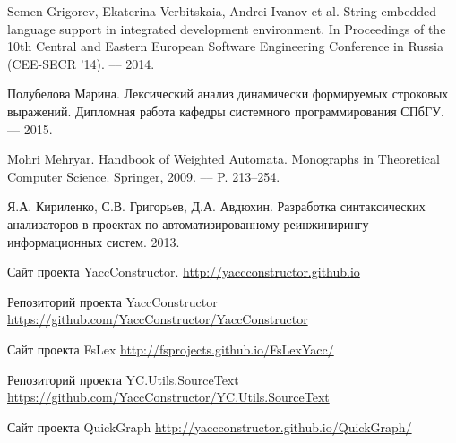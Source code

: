 \begin{thebibliography}{99}

  Semen Grigorev, Ekaterina Verbitskaia, Andrei Ivanov et al.
  String-embedded language support in integrated development environment.
  In Proceedings of the 10th Central and Eastern European Software Engineering Conference in Russia (CEE-SECR ’14). –– 2014.

  Полубелова Марина.
  Лексический анализ динамически формируемых строковых выражений.
  Дипломная работа кафедры системного программирования СПбГУ. –– 2015.

  Mohri Mehryar. 
  Handbook of Weighted Automata.
  Monographs in Theoretical Computer Science. Springer, 2009. –– P. 213–254. 

  Я.А. Кириленко, С.В. Григорьев, Д.А. Авдюхин. 
  Разработка синтаксических анализаторов в проектах по автоматизированному реинжинирингу информационных систем. 
  2013. 

  Сайт проекта YaccConstructor.
  \url{http://yaccconstructor.github.io}

  Репозиторий проекта YaccConstructor
  \url{https://github.com/YaccConstructor/YaccConstructor}

  Сайт проекта FsLex
  \url{http://fsprojects.github.io/FsLexYacc/}

  Репозиторий проекта YC.Utils.SourceText
  \url{https://github.com/YaccConstructor/YC.Utils.SourceText}

  Сайт проекта QuickGraph
  \url{http://yaccconstructor.github.io/QuickGraph/}

\end{thebibliography}

